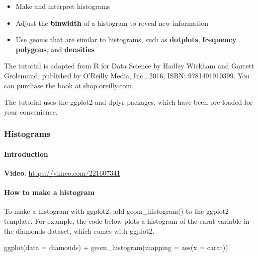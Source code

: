 \documentclass[
]{article}
\newenvironment{Shaded}{\begin{snugshade}}{\end{snugshade}}
\newcommand{\AttributeTok}[1]{\textcolor[rgb]{0.77,0.63,0.00}{#1}}
\newcommand{\FunctionTok}[1]{\textcolor[rgb]{0.00,0.00,0.00}{#1}}
\newcommand{\NormalTok}[1]{#1}
\newcommand{\SpecialCharTok}[1]{\textcolor[rgb]{0.00,0.00,0.00}{#1}}
\providecommand{\tightlist}{%
  \setlength{\itemsep}{0pt}\setlength{\parskip}{0pt}}
\begin{document}
\begin{itemize}
\tightlist
\item
  Make and interpret histograms
\item
  Adjust the \textbf{binwidth} of a histogram to reveal new information
\item
  Use geoms that are similar to histograms, such as \textbf{dotplots},
  \textbf{frequency polygons}, and \textbf{densities}
\end{itemize}

The tutorial is adapted from R for Data Science by Hadley Wickham and
Garrett Grolemund, published by O'Reilly Media, Inc., 2016, ISBN:
9781491910399. You can purchase the book at shop.oreilly.com.

The tutorial uses the ggplot2 and dplyr packages, which have been
pre-loaded for your convenience.

\hypertarget{histograms-1}{%
\subsubsection{Histograms}\label{histograms-1}}

\hypertarget{introduction}{%
\paragraph{Introduction}\label{introduction}}

\textbf{Video}: \url{https://vimeo.com/221607341}

\hypertarget{how-to-make-a-histogram}{%
\paragraph{How to make a histogram}\label{how-to-make-a-histogram}}

To make a histogram with ggplot2, add geom\_histogram() to the ggplot2
template. For example, the code below plots a histogram of the carat
variable in the diamonds dataset, which comes with ggplot2.

\begin{Shaded}
\begin{Highlighting}[]
\FunctionTok{ggplot}\NormalTok{(}\AttributeTok{data =}\NormalTok{ diamonds) }\SpecialCharTok{+}
  \FunctionTok{geom\_histogram}\NormalTok{(}\AttributeTok{mapping =} \FunctionTok{aes}\NormalTok{(}\AttributeTok{x =}\NormalTok{ carat))}
\end{Highlighting}
\end{Shaded}
\end{document}
